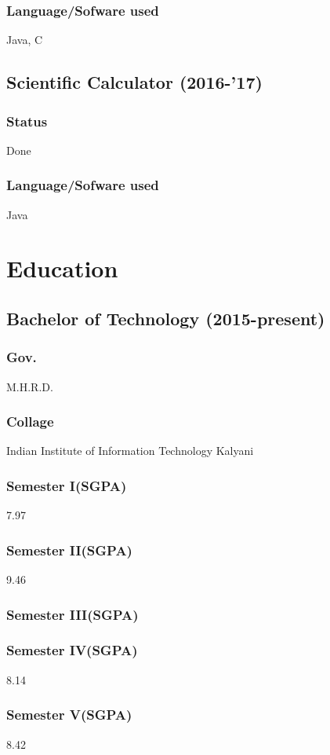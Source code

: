 \documentclass{article}
\begin{document}
\subsubsection{Language/Sofware used} Java, C

\subsection{Scientific Calculator (2016-'17)}
\subsubsection{Status}  Done
\subsubsection{Language/Sofware used} Java

\section{Education}
\subsection{Bachelor of Technology (2015-present)}
\subsubsection{Gov.}	M.H.R.D.
\subsubsection{Collage}	Indian Institute of Information Technology Kalyani
\subsubsection{Semester I(SGPA)}	7.97
\subsubsection{Semester II(SGPA)}	9.46
\subsubsection{Semester III(SGPA)}	%
\subsubsection{Semester IV(SGPA)}	8.14
\subsubsection{Semester V(SGPA)}	8.42
\end{document}
